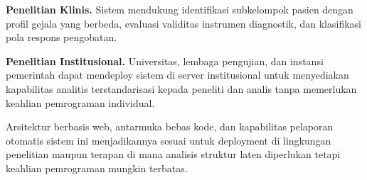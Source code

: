 \documentclass[12pt,a4paper]{article}
\begin{document}
\textbf{Penelitian Klinis.} Sistem mendukung identifikasi subkelompok pasien dengan profil gejala yang berbeda, evaluasi validitas instrumen diagnostik, dan klasifikasi pola respons pengobatan.

\textbf{Penelitian Institusional.} Universitas, lembaga pengujian, dan instansi pemerintah dapat mendeploy sistem di server institusional untuk menyediakan kapabilitas analitis terstandarisasi kepada peneliti dan analis tanpa memerlukan keahlian pemrograman individual.

Arsitektur berbasis web, antarmuka bebas kode, dan kapabilitas pelaporan otomatis sistem ini menjadikannya sesuai untuk deployment di lingkungan penelitian maupun terapan di mana analisis struktur laten diperlukan tetapi keahlian pemrograman mungkin terbatas.
\end{document}
